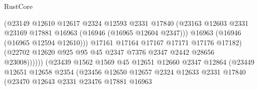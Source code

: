 \begin{lexlean}{RustCore}
\begin{coremodule}
                                        (@23149
                                          @12610
                                          @12617
                                          @2324
                                          @12593
                                          @2331
                                          @17840
                                          (@23163
                                            @12603
                                            @2331
                                            @23169
                                            @17881
                                            @16963
                                            (@16946 (@16965 @12604 @2347)))
                                          @16963
                                          (@16946 (@16965 @12594 @12610)))
                                        @17161
                                        @17164
                                        @17167
                                        @17171
                                        @17176
                                        @17182)
                                      (@22702
                                        @12620
                                        @925
                                        @95
                                        @45
                                        @2347
                                        @7376
                                        @2347
                                        @2442
                                        @28656
                                        @23008))))))
                            (@23439
                              @1562
                              @1569
                              @45
                              @12651
                              @12660
                              @2347
                              @12864
                              (@23449
                                @12651
                                @12658
                                @2354
                                (@23456
                                  @12650
                                  @12657
                                  @2324
                                  @12633
                                  @2331
                                  @17840
                                  (@23470
                                    @12643
                                    @2331
                                    @23476
                                    @17881
                                    @16963

\end{coremodule}
\end{lexlean}

